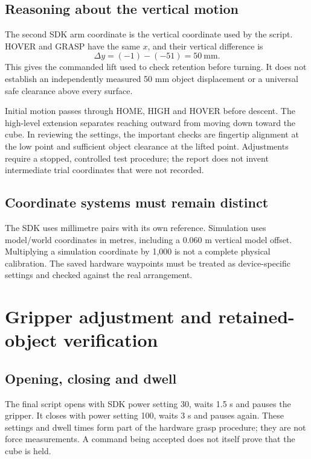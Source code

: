 \subsection{Reasoning about the vertical motion}
The second SDK arm coordinate is the vertical coordinate used by the script. HOVER and GRASP have the same $x$, and their vertical difference is
\begin{equation}
\Delta y=(-1)-(-51)=50\ \mathrm{mm}.
\end{equation}
This gives the commanded lift used to check retention before turning. It does not establish an independently measured 50 mm object displacement or a universal safe clearance above every surface.

Initial motion passes through HOME, HIGH and HOVER before descent. The high-level extension separates reaching outward from moving down toward the cube. In reviewing the settings, the important checks are fingertip alignment at the low point and sufficient object clearance at the lifted point. Adjustments require a stopped, controlled test procedure; the report does not invent intermediate trial coordinates that were not recorded.
\subsection{Coordinate systems must remain distinct}
The SDK uses millimetre pairs with its own reference. Simulation uses model/world coordinates in metres, including a 0.060 m vertical model offset. Multiplying a simulation coordinate by 1,000 is not a complete physical calibration. The saved hardware waypoints must be treated as device-specific settings and checked against the real arrangement.
\clearpage
\section{Gripper adjustment and retained-object verification}
\subsection{Opening, closing and dwell}
The final script opens with SDK power setting 30, waits 1.5 s and pauses the gripper. It closes with power setting 100, waits 3 s and pauses again. These settings and dwell times form part of the hardware grasp procedure; they are not force measurements. A command being accepted does not itself prove that the cube is held.

